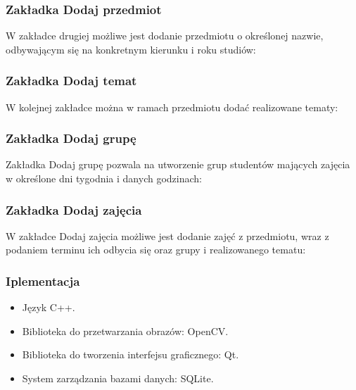 \documentclass{beamer}
\begin{document}
\begin{frame}
\frametitle{Zakładka Dodaj przedmiot}
W zakładce drugiej możliwe jest dodanie przedmiotu o określonej nazwie, odbywającym się na konkretnym kierunku i roku studiów:

\end{frame}

\begin{frame}
\frametitle{Zakładka Dodaj temat}
W kolejnej zakładce można w ramach przedmiotu dodać realizowane tematy:

\end{frame}

\begin{frame}
\frametitle{Zakładka Dodaj grupę}
Zakładka Dodaj grupę pozwala na utworzenie grup studentów mających zajęcia w określone dni tygodnia i danych godzinach:

\end{frame}

\begin{frame}
\frametitle{Zakładka Dodaj zajęcia}
W zakładce Dodaj zajęcia możliwe jest dodanie zajęć z przedmiotu, wraz z podaniem terminu ich odbycia się oraz grupy i realizowanego tematu:

\end{frame}

\begin{frame}
\frametitle{Iplementacja}
\begin{itemize}
\item Język C++.
\item Biblioteka do przetwarzania obrazów: OpenCV.
\item Biblioteka do tworzenia interfejsu graficznego: Qt.
\item System zarządzania bazami danych: SQLite.
\end{itemize}
\end{frame}

\end{document}
